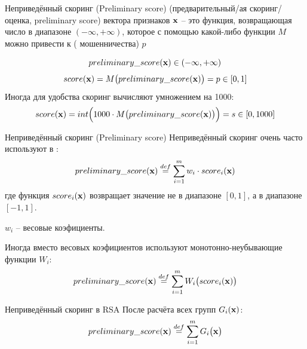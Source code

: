 \begin{frame}{Неприведённый скоринг (Preliminary score)}
	 (предварительный/ая скоринг/оценка, preliminary score)
	вектора признаков $\bold x$ -- это функция, возвращающая число в диапазоне $(- \infty, + \infty)$, которое с помощью 
	какой-либо  функции $M$
	можно привести к  ( мошенничества) $p$
	
	\begin{equation*}
	preliminary\_score(\bold x) \in (- \infty, + \infty)
	\end{equation*}
	\begin{equation}
	score(\bold x) = M \big( preliminary\_score(\bold x) \big) = p \in [0, 1]
	\end{equation}
	Иногда для удобства скоринг вычисляют умножением на 1000:
	\begin{equation}\label{eq:score_preliminary_score}
	score(\bold x) = int \Big( 1000 \cdot M \big( preliminary\_score(\bold x) \big) \Big) = s \in [0, 1000]
	\end{equation}	
\end{frame}

\begin{frame}{Неприведённый скоринг (Preliminary score)}
	Неприведённый скоринг очень часто используют в 
	:
	\begin{equation}
	preliminary\_score(\bold x) \stackrel{def}{=} \sum_{i=1}^{m} w_i \cdot score_i (\bold x)
	\end{equation}
	где функция $score_i (\bold x)$ возвращает значение не в диапазоне $[0, 1]$,
	а в диапазоне $[-1, 1]$.

	$w_i$ -- весовые коэфициенты. 
	
	Иногда вместо весовых коэфициентов используют монотонно-неубывающие функции $W_i$:
	\begin{equation}
	preliminary\_score(\bold x) \stackrel{def}{=} \sum_{i=1}^{m} W_i \big( score_i (\bold x) \big)
	\end{equation}
\end{frame}

\begin{frame}{Неприведённый скоринг в RSA}
	После расчёта всех групп $G_i ( \bold x )$: 
	\begin{equation}
	preliminary\_score(\bold x) \stackrel{def}{=} \sum_{i=1}^{m} G_i \big( \bold x \big)
	\end{equation}
\end{frame}

